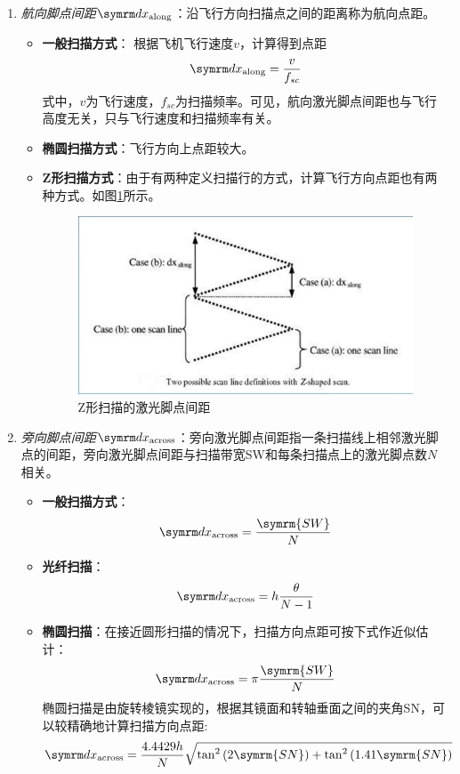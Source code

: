 \begin{enumerate}
	\item \textit{航向脚点间距$ \diff x_{\text{along}} $}：沿飞行方向扫描点之间的距离称为航向点距。
		\begin{itemize}
			\item \textbf{一般扫描方式}：
				根据飞机飞行速度$ v $，计算得到点距
				\begin{equation}
				\diff x_{\text{along}} = \dfrac{v}{f_{sc}}
				\end{equation}
				式中，$ v $为飞行速度，$ f_{sc} $为扫描频率。可见，航向激光脚点间距也与飞行高度无关，只与飞行速度和扫描频率有关。
			\item \textbf{椭圆扫描方式}：飞行方向上点距较大。
			\item \textbf{Z形扫描方式}：由于有两种定义扫描行的方式，计算飞行方向点距也有两种方式。如图\ref{fig:Z形扫描的激光脚点间距}所示。
				\begin{figure}[htbp]
					\centering
					\includegraphics[width=0.7\linewidth]{figure/Chapter4/Z形扫描的激光脚点间距}
					\caption{Z形扫描的激光脚点间距}
					\label{fig:Z形扫描的激光脚点间距}
				\end{figure}
		\end{itemize} %
	\item \textit{旁向脚点间距$ \diff x_{\text{across}} $}：旁向激光脚点间距指一条扫描线上相邻激光脚点的间距，旁向激光脚点间距与扫描带宽SW和每条扫描点上的激光脚点数$ N $相关。
		\begin{itemize}
			\item \textbf{一般扫描方式}：
				\begin{equation}
				\diff x_{\text{across}} = \dfrac{\symrm{SW}}{N}
				\end{equation}
			\item \textbf{光纤扫描}：
				\begin{equation}
				\diff x_{\text{across}} = h \dfrac{\theta}{N-1}
				\end{equation}
			\item \textbf{椭圆扫描}：在接近圆形扫描的情况下，扫描方向点距可按下式作近似估计：
				\begin{equation}
				\diff x_{\text{across}} = \pi \dfrac{\symrm{SW}}{N}
				\end{equation}
				椭圆扫描是由旋转棱镜实现的，根据其镜面和转轴垂面之间的夹角SN，可以较精确地计算扫描方向点距:
				\begin{equation}
				\diff x_{\text{across}} = \dfrac{4.4429 h}{N} \sqrt{\tan^2 \left(2\symrm{SN}\right) + \tan^2 \left(1.41\symrm{SN}\right)}
				\end{equation}
		\end{itemize} %
\end{enumerate} %

